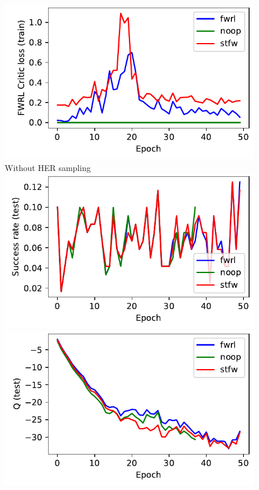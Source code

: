 \begin{figure}
  \includegraphics[width=\frac\columnwidth]{media/res/ea0e35b-FetchPush-v1-stfw-future/train/critic_addnl_loss.pdf}\\
  Without HER sampling\\
  \includegraphics[width=\frac\columnwidth]{media/res/ea0e35b-FetchPush-v1-stfw-none/test/success_rate.pdf}%
  \includegraphics[width=\frac\columnwidth]{media/res/ea0e35b-FetchPush-v1-stfw-none/test/mean_Q.pdf}%

\end{figure}
